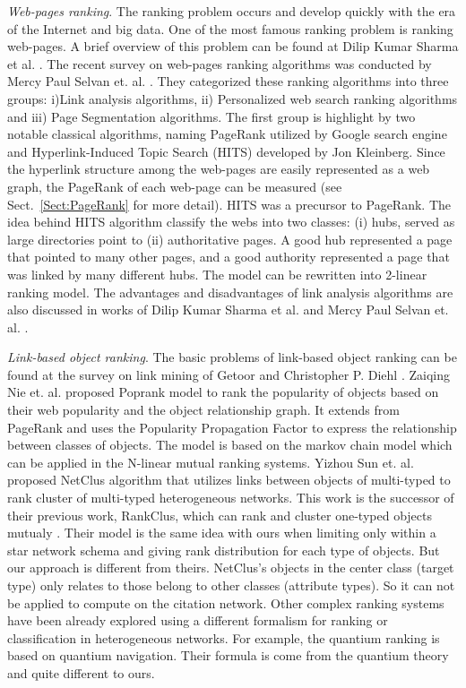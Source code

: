 \documentclass[10pt,leqno,twoside]{article}
\begin{document}
\textit{Web-pages ranking}. The ranking problem occurs and develop quickly with the era of the Internet and big data. One of the most famous ranking problem is ranking web-pages. A brief overview of this problem can be found at Dilip Kumar Sharma et al. \cite{RankOverview}. The recent survey on web-pages ranking algorithms was conducted by Mercy Paul Selvan et. al. \cite{SurveyWebRank}. They categorized these ranking algorithms into three groups: i)Link analysis algorithms, ii) Personalized web search ranking algorithms and iii) Page Segmentation algorithms.
The first group is highlight by two notable classical algorithms, naming PageRank \cite{pagerank98} utilized by Google search engine and Hyperlink-Induced Topic  Search (HITS) \cite{HITS} developed by Jon Kleinberg.
Since the hyperlink structure among the web-pages are easily represented as a web graph,
the PageRank of each web-page can be measured (see Sect.~\ref{Sect:PageRank} for more detail). HITS was a precursor to PageRank. The idea behind HITS algorithm classify the webs into two classes: (i) hubs, served as large directories point to (ii) authoritative pages. A good hub represented a page that pointed to many other pages, and a good authority represented a page that was linked by many different hubs. The model can be rewritten into 2-linear ranking model.
The advantages and disadvantages of link analysis algorithms are also discussed in works of Dilip Kumar Sharma et al. \cite{RankOverview} and Mercy Paul Selvan et. al. \cite{SurveyWebRank}.

\textit{Link-based object ranking}. The basic problems of link-based object ranking can be found at the survey on link mining of Getoor and Christopher P. Diehl \cite{LinkMining}. Zaiqing Nie et. al. proposed Poprank model \cite{poprank} to rank the popularity of objects based on their web popularity and the object relationship graph. It extends from PageRank and uses the Popularity Propagation Factor to express the relationship between classes of objects. The model is based on the markov chain model which can be applied in the N-linear mutual ranking systems.
Yizhou Sun et. al. proposed NetClus algorithm \cite{NetClus} that utilizes links between objects of multi-typed to rank cluster of multi-typed heterogeneous networks. This work is the successor of their previous work, RankClus, which can rank and cluster one-typed objects mutualy \cite{RankClus}. Their model is the same idea with ours when limiting only within a star network schema and giving rank distribution for each type of objects. But our approach is different from theirs. NetClus's objects in the center class (target type) only relates to those belong to other classes (attribute types). So it can not be applied to compute on the citation network. Other complex ranking systems have been already explored using a different formalism for ranking or classification in heterogeneous networks. For example, the quantium ranking \cite{complexrank} is based on quantium navigation. Their formula is come from the quantium theory and quite different to ours.
\end{document}
